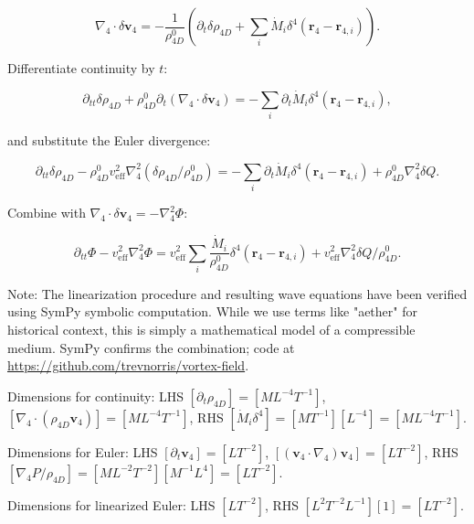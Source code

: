 \begin{equation}
\nabla_4 \cdot \delta \mathbf{v}_4 = -\frac{1}{\rho_{4D}^0} \left( \partial_t \delta \rho_{4D} + \sum_i \dot{M}_i \delta^4(\mathbf{r}_4 - \mathbf{r}_{4,i}) \right).
\end{equation}

Differentiate continuity by $t$:

\begin{equation}
\partial_{tt} \delta \rho_{4D} + \rho_{4D}^0 \partial_t (\nabla_4 \cdot \delta \mathbf{v}_4) = -\sum_i \partial_t \dot{M}_i \delta^4(\mathbf{r}_4 - \mathbf{r}_{4,i}),
\end{equation}

and substitute the Euler divergence:

\begin{equation}
\partial_{tt} \delta \rho_{4D} - \rho_{4D}^0 v_{\text{eff}}^2 \nabla_4^2 (\delta \rho_{4D} / \rho_{4D}^0) = -\sum_i \partial_t \dot{M}_i \delta^4(\mathbf{r}_4 - \mathbf{r}_{4,i}) + \rho_{4D}^0 \nabla_4^2 \delta Q.
\end{equation}

Combine with $\nabla_4 \cdot \delta \mathbf{v}_4 = -\nabla_4^2 \Phi$:

\begin{equation}
\partial_{tt} \Phi - v_{\text{eff}}^2 \nabla_4^2 \Phi = v_{\text{eff}}^2 \sum_i \frac{\dot{M}_i}{\rho_{4D}^0} \delta^4(\mathbf{r}_4 - \mathbf{r}_{4,i}) + v_{\text{eff}}^2 \nabla_4^2 \delta Q / \rho_{4D}^0.
\end{equation}

Note: The linearization procedure and resulting wave equations have been verified using SymPy symbolic computation. While we use terms like "aether" for historical context, this is simply a mathematical model of a compressible medium. SymPy confirms the combination; code at \url{https://github.com/trevnorris/vortex-field}.

\begin{tcolorbox}[title=Dimensional Checks]
Dimensions for continuity: LHS $[\partial_t \rho_{4D}] = [M L^{-4} T^{-1}]$, $[\nabla_4 \cdot (\rho_{4D} \mathbf{v}_4)] = [M L^{-4} T^{-1}]$, RHS $[\dot{M}_i \delta^4] = [M T^{-1}] [L^{-4}] = [M L^{-4} T^{-1}]$.

Dimensions for Euler: LHS $[\partial_t \mathbf{v}_4] = [L T^{-2}]$, $[(\mathbf{v}_4 \cdot \nabla_4) \mathbf{v}_4] = [L T^{-2}]$, RHS $[\nabla_4 P / \rho_{4D}] = [M L^{-2} T^{-2}] [M^{-1} L^{4}] = [L T^{-2}]$.

Dimensions for linearized Euler: LHS $[L T^{-2}]$, RHS $[L^2 T^{-2} L^{-1}] [1] = [L T^{-2}]$.
\end{tcolorbox}

